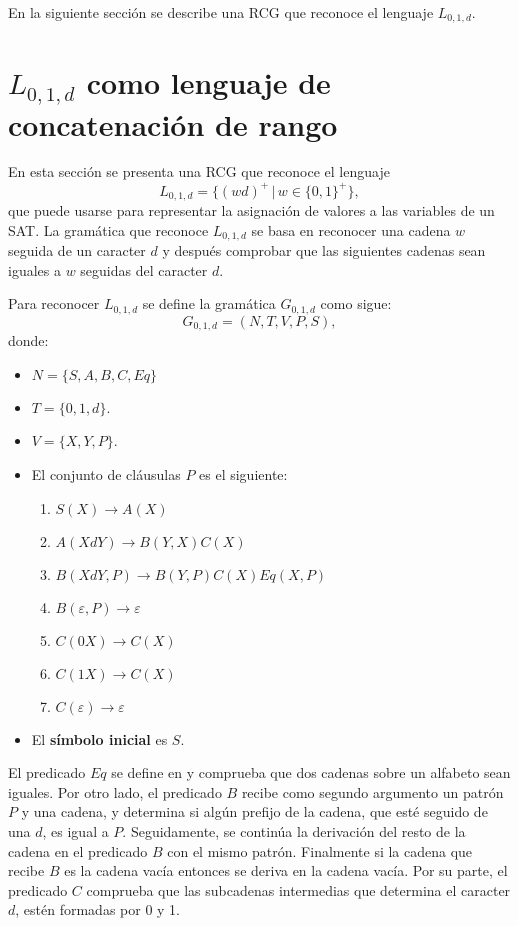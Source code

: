 \documentclass[12pt]{article}
\begin{document}
En la siguiente sección se describe una RCG que reconoce el lenguaje $L_{0,1,d}$.

\section{$L_{0,1,d}$ como lenguaje de concatenación de rango}

En esta sección se presenta una RCG que reconoce el lenguaje $$L_{0,1,d}=\{(wd)^+\,|\,w\in\{0,1\}^+\},$$ que puede usarse para representar la asignación de valores a las variables de un SAT. La gramática que reconoce $L_{0,1,d}$ se basa en reconocer una cadena $w$ seguida de un caracter $d$ y después comprobar que las siguientes cadenas sean iguales a $w$ seguidas del caracter $d$.

Para reconocer $L_{0,1,d}$ se define la gramática $G_{0,1,d}$ como sigue:
\[
    G_{0,1,d} = (N, T, V, P, S),
\]
donde:

\begin{itemize}
    \item $N=\{S,A,B,C,Eq\}$
    \item $T=\{0,1,d\}$.
    \item $V=\{X,Y,P\}$.
    \item El conjunto de cláusulas $P$ es el siguiente:
          \begin{enumerate}
              \item $S(X)\to A(X)$
              \item $A(XdY)\to B(Y,X)C(X)$
              \item $B(XdY,P)\to B(Y,P) C(X) Eq(X,P)$
              \item $B(\varepsilon,P)\to \varepsilon$
              \item $C(0X)\to C(X)$
              \item $C(1X)\to C(X)$
              \item $C(\varepsilon)\to \varepsilon$
          \end{enumerate}
    \item El \textbf{símbolo inicial} es $S$.
\end{itemize}

El predicado $Eq$ se define en \cite{mainRCGBib} y comprueba que dos cadenas sobre un alfabeto sean iguales. 
Por otro lado, el predicado $B$ recibe como segundo argumento un patrón $P$  y una cadena, y determina si 
algún prefijo de la cadena, que esté seguido de una $d$, es igual a $P$. Seguidamente, se continúa la 
derivación del resto de la cadena en el predicado $B$ con el mismo patrón. Finalmente si la cadena que 
recibe $B$ es la cadena vacía entonces se deriva en la cadena vacía. Por su parte, el predicado $C$
comprueba que las subcadenas intermedias que determina el caracter $d$, estén formadas por 0 y 1.
\end{document}
